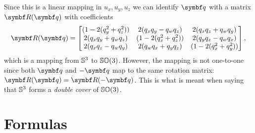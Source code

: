 Since this is a linear mapping in $u_x, u_y, u_z$ we can identify $\bq$ with a matrix $\bR(\bq)$ with coefficients
\begin{equation}
  \label{eq:quat_to_so3}
  \bR(\bq) = \begin{bmatrix}
    (1 - 2(q_y^2 + q_z^2)) & 2(q_x q_y - q_w q_z)    & 2( q_x q_z + q_w q_y ) \\
    2(q_x q_y + q_w q_z)   & (1 - 2 (q_x^2 + q_z^2)) & 2( q_y q_z-q_w q_x)    \\
    2 (q_x q_z  - q_w q_y) & 2 (q_w q_x + q_y q_z)   & (1 - 2(q_x^2 + q_y^2))
  \end{bmatrix},
\end{equation}
which is a mapping from ${\mathbb{S}^3}$ to ${\mathbb{SO}(3)}$. However, the mapping is not one-to-one since both $\bq$ and $-\bq$ map to the same rotation matrix: $\bR(\bq) = \bR(-\bq)$. This is what is meant when saying that ${\mathbb{S}^3}$ forms a \emph{double cover} of ${\mathbb{SO}(3)}$.


\section{Formulas}

